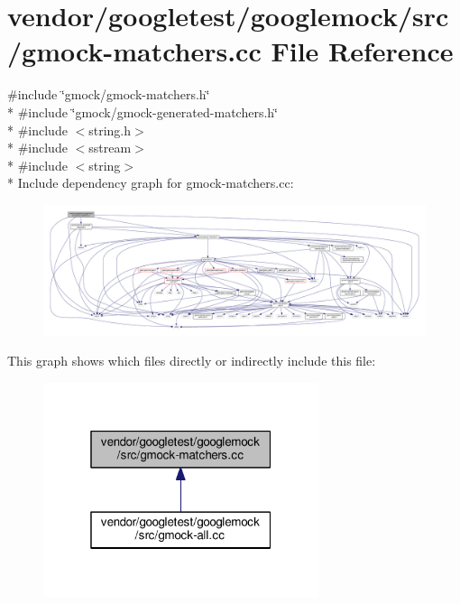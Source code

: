 \hypertarget{gmock-matchers_8cc}{}\section{vendor/googletest/googlemock/src/gmock-\/matchers.cc File Reference}
\label{gmock-matchers_8cc}
{\ttfamily \#include \char`\"{}gmock/gmock-\/matchers.\+h\char`\"{}}\\*
{\ttfamily \#include \char`\"{}gmock/gmock-\/generated-\/matchers.\+h\char`\"{}}\\*
{\ttfamily \#include $<$string.\+h$>$}\\*
{\ttfamily \#include $<$sstream$>$}\\*
{\ttfamily \#include $<$string$>$}\\*
Include dependency graph for gmock-\/matchers.cc\+:
\nopagebreak
\begin{figure}[H]
\begin{center}
\leavevmode
\includegraphics[width=350pt]{gmock-matchers_8cc__incl}
\end{center}
\end{figure}
This graph shows which files directly or indirectly include this file\+:
\nopagebreak
\begin{figure}[H]
\begin{center}
\leavevmode
\includegraphics[width=229pt]{gmock-matchers_8cc__dep__incl}
\end{center}
\end{figure}
